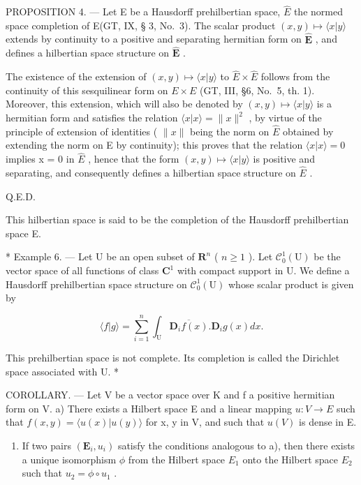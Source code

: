 PROPOSITION 4. --- Let E be a Hausdorff prehilbertian space, \(\hat{E}\) the normed space completion of E(GT, IX, § 3, No.~3). The scalar product \((x, y) \mapsto \langle x|y \rangle\) extends by continuity to a positive and separating hermitian form on \(\hat{\mathbf{E}}\) , and defines a hilbertian space structure on \(\hat{\mathbf{E}}\) .

The existence of the extension of \((x, y) \mapsto \langle x|y \rangle\) to \(\hat{E} \times \hat{E}\) follows from the continuity of this sesquilinear form on \(E \times E\) (GT, III, §6, No.~5, th. 1). Moreover, this extension, which will also be denoted by \((x, y) \mapsto \langle x|y \rangle\) is a hermitian form and satisfies the relation \(\langle x|x\rangle = \|x\|^2\) , by virtue of the principle of extension of identities ( \(\|x\|\) being the norm on \(\hat{E}\) obtained by extending the norm on E by continuity); this proves that the relation \(\langle x|x\rangle = 0\) implies x = 0 in \(\hat{E}\) , hence that the form \((x, y) \mapsto \langle x|y \rangle\) is positive and separating, and consequently defines a hilbertian space structure on \(\hat{E}\) .

Q.E.D.

This hilbertian space is said to be the completion of the Hausdorff prehilbertian space E.

* Example 6. --- Let U be an open subset of \(\mathbf{R}^n\) ( \(n \geqslant 1\) ). Let \(\mathcal{C}_0^1(\mathrm{U})\) be the vector space of all functions of class \(\mathbf{C}^1\) with compact support in U. We define a Hausdorff prehilbertian space structure on \(\mathcal{C}_0^1(\mathrm{U})\) whose scalar product is given by

\[
\langle f | g \rangle = \sum_ {i = 1} ^ {n} \int_ {\mathrm{U}} \overline {{{{\mathbf {D} _ {i} f (x)}}}}. \mathbf {D} _ {i} g (x) d x.
\]

This prehilbertian space is not complete. Its completion is called the Dirichlet space associated with U. *

COROLLARY. --- Let V be a vector space over K and f a positive hermitian form on V. a) There exists a Hilbert space E and a linear mapping \(u:V \rightarrow E\) such that \(f(x,y) = \langle u(x)|u(y) \rangle\) for x, y in V, and such that \(u(V)\) is dense in E.

\begin{enumerate}
\def\labelenumi{\alph{enumi})}
\setcounter{enumi}{1}
\tightlist
\item
  If two pairs \((\mathbf{E}_{i}, u_{i})\) satisfy the conditions analogous to a), then there exists a unique isomorphism \(\phi\) from the Hilbert space \(E_{1}\) onto the Hilbert space \(E_{2}\) such that \(u_{2} = \phi \circ u_{1}\) .
\end{enumerate}

